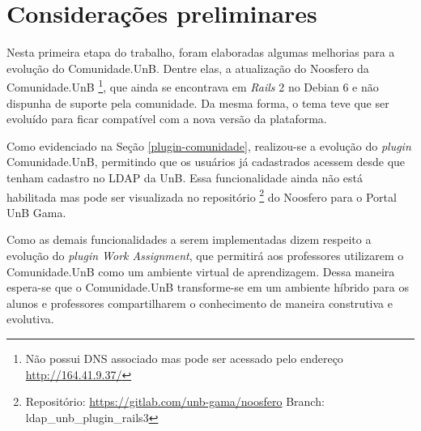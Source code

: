 \chapter{Considerações preliminares}
\label{consideracoes-preliminares}

Nesta primeira etapa do trabalho, foram elaboradas algumas melhorias para a evolução do Comunidade.UnB. Dentre elas, a atualização do Noosfero da Comunidade.UnB \footnote{Não possui DNS associado mas pode ser acessado pelo endereço \url{http://164.41.9.37/}}, que ainda se encontrava em \textit{Rails} 2 no Debian 6 e não dispunha de suporte pela comunidade. Da mesma forma, o tema teve que ser evoluído para ficar compatível com a nova versão da plataforma.


Como evidenciado na Seção \ref{plugin-comunidade}, realizou-se a evolução do \textit{plugin} Comunidade.UnB, permitindo que os usuários já cadastrados acessem desde que tenham cadastro no LDAP da UnB. Essa funcionalidade ainda não está habilitada mas pode ser visualizada no repositório \footnote{Repositório: \url{https://gitlab.com/unb-gama/noosfero} Branch: ldap\_unb\_plugin\_rails3 } do Noosfero para o Portal UnB Gama.



Como as demais funcionalidades a serem implementadas dizem respeito a evolução do \textit{plugin Work Assignment}, que permitirá aos professores utilizarem o Comunidade.UnB como um ambiente virtual de aprendizagem. Dessa maneira espera-se que o Comunidade.UnB transforme-se em um ambiente híbrido para os alunos e professores compartilharem o conhecimento de maneira construtiva e evolutiva.

